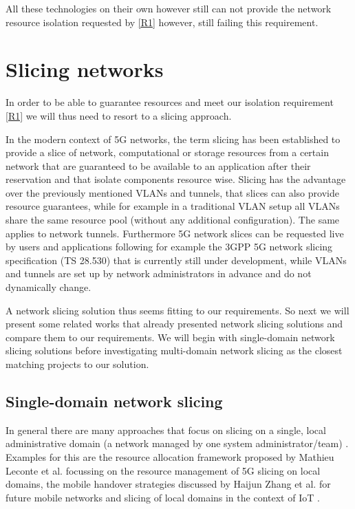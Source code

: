 All these technologies on their own however still can not provide the network resource isolation requested by \ref{R1} however, still failing this requirement.

\section{Slicing networks}
In order to be able to guarantee resources and meet our isolation requirement \ref{R1} we will thus need to resort to a slicing approach.

In the modern context of 5G networks, the term slicing has been established to provide a slice of network, computational or storage resources from a certain network that are guaranteed to be available to an application after their reservation \cite{5G1,5G2,5G3} and that isolate components resource wise. Slicing has the advantage over the previously mentioned VLANs and tunnels, that slices can also provide resource guarantees, while for example in a traditional VLAN setup all VLANs share the same resource pool (without any additional configuration). The same applies to network tunnels. Furthermore 5G network slices can be requested live by users and applications following for example the 3GPP 5G network slicing specification (TS 28.530) \cite{3gpp28.530} that is currently still under development, while VLANs and tunnels are set up by network administrators in advance and do not dynamically change.

A network slicing solution thus seems fitting to our requirements. So next we will present some related works that already presented network slicing solutions and compare them to our requirements. We will begin with single-domain network slicing solutions before investigating multi-domain network slicing as the closest matching projects to our solution.

\subsection{Single-domain network slicing} In general there are many approaches that focus on slicing on a single, local administrative domain (a network managed by one system administrator/team) \cite{SD1,SD2,SD3}. Examples for this are the resource allocation framework proposed by Mathieu Leconte et al. \cite{SD3} focussing on the resource management of 5G slicing on local domains, the mobile handover strategies discussed by Haijun Zhang et al. \cite{SD1} for future mobile networks and slicing of local domains in the context of IoT \cite{SD2}.

